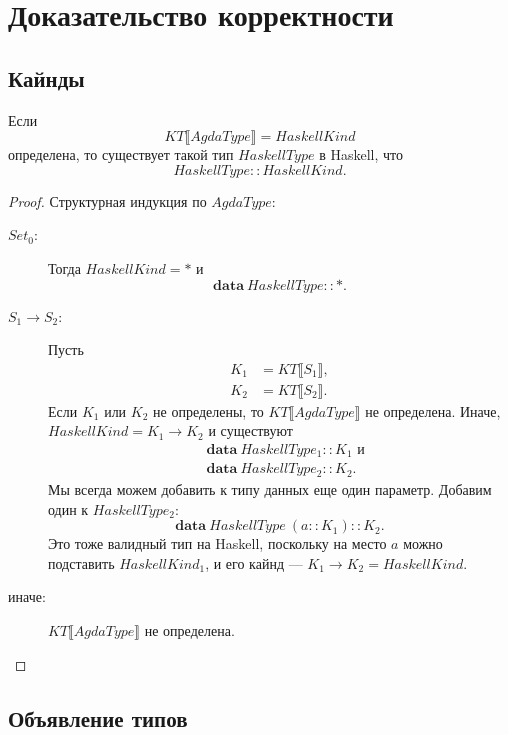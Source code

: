 \section{Доказательство корректности}\label{sec:appendix-proof}

\subsection{Кайнды}

\begin{thm}\label{thm:kinds}
Если
\[
KT\llbracket AgdaType \rrbracket = HaskellKind
\]
определена, то существует такой тип \(HaskellType\) в Haskell, что
\[
HaskellType :: HaskellKind.
\]
\end{thm}

\begin{proof}
Структурная индукция по \(AgdaType\):
\begin{description}
\item[\(Set_0\):] Тогда \(HaskellKind = *\) и
   \[
   \mathbf{data}\ HaskellType :: *.
   \]
\item[\(S_1 \rightarrow S_2\):] Пусть
   \begin{align*}
   K_1 &= KT\llbracket S_1 \rrbracket,\\
   K_2 &= KT\llbracket S_2 \rrbracket.
   \end{align*}
   Если \(K_1\) или \(K_2\) не определены, то \(KT\llbracket AgdaType \rrbracket\)
   не определена. Иначе, \(HaskellKind = K_1 \rightarrow K_2\) и существуют
   \begin{align*}
   &\mathbf{data}\ HaskellType_1 :: K_1\text{ и}\\
   &\mathbf{data}\ HaskellType_2 :: K_2.
   \end{align*}
   Мы всегда можем добавить к типу данных еще один параметр. Добавим один к
   \(HaskellType_2\):
   \[
   \mathbf{data}\ HaskellType\ (a :: K_1) :: K_2.
   \]
   Это тоже валидный тип на Haskell, поскольку на место \(a\) можно подставить
   \(HaskellKind_1\), и его кайнд --- \(K_1 \rightarrow K_2 = HaskellKind\).
\item[\textnormal{иначе}:] \(KT\llbracket AgdaType \rrbracket\) не определена.
\end{description}
\end{proof}

\subsection{Объявление типов}

